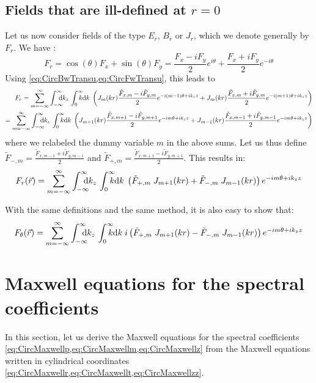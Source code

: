 \subsection{Fields that are ill-defined at $r=0$}

Let us now consider fields of the type $E_r$, $B_r$ or $J_r$, which we
denote generally by $F_r$. We have :
\[ F_r = \cos(\theta) F_x + \sin(\theta) F_y 
= \frac{F_x - iF_y}{2}e^{i\theta} + \frac{F_x +
  iF_y}{2}e^{-i\theta} \] 
Using \cref{eq:CircBwTransu,eq:CircFwTransu}, this leads to
\begin{align} 
F_r =  \sum_{m=-\infty}^{\infty} \Integ{k_z}\,\RInteg{k}\;
\left(  J_m(kr) \frac{\tilde{F}_{x,m} -
    i\tilde{F}_{y,m}}{2}e^{-i(m-1)\theta +ik_z z} + J_m(kr)
  \frac{\tilde{F}_{x,m} +   i\tilde{F}_{y,m}}{2}e^{-i(m+1)\theta +
    ik_z z} \right) \\
= \sum_{m=-\infty}^{\infty} \Integ{k_z}\,\RInteg{k}\;
\left(  J_{m+1}(kr) \frac{\tilde{F}_{x,m+1} -
    i\tilde{F}_{y,m+1}}{2}e^{-im\theta +ik_z z} + J_{m-1}(kr)
  \frac{\tilde{F}_{x,m-1} +   i\tilde{F}_{y,m-1}}{2}e^{-im\theta +
    ik_z z} \right) 
\end{align}
where we relabeled the dummy variable $m$ in the above sums. Let us
thus define $\tilde{F}_{-,m} = \frac{\tilde{F}_{x,m-1} +
    i\tilde{F}_{y,m-1}}{2}$ and $\tilde{F}_{+,m} = \frac{\tilde{F}_{x,m+1} -
    i\tilde{F}_{y,m+1}}{2}$. This results in:
\begin{equation} 
F_r(\vec{r}) = \sum_{m=-\infty}^{\infty} \Integ{k_z}\,\RInteg{k}\;
\left( \tilde{F}_{+,m}\; J_{m+1}(kr) +\tilde{F}_{-,m}\; J_{m-1}(kr)
\right)  e^{-im\theta +ik_z z}
\end{equation}

With the same definitions and the same method, it is also easy to show that:
\begin{equation} 
F_\theta(\vec{r}) = \sum_{m=-\infty}^{\infty} \Integ{k_z}\,\RInteg{k}\;
i\left( \tilde{F}_{+,m}\; J_{m+1}(kr) - \tilde{F}_{-,m}\; J_{m-1}(kr)
\right)  e^{-im\theta +ik_z z}
\end{equation}

\section{Maxwell equations for the spectral coefficients}
\label{sec:SpectMaxwell}

In this section, let us derive the Maxwell equations for the spectral
coefficients \cref{eq:CircMaxwellp,eq:CircMaxwellm,eq:CircMaxwellz}
from the Maxwell equations written in cylindrical coordinates \cref{eq:CircMaxwellr,eq:CircMaxwellt,eq:CircMaxwellzz}.

